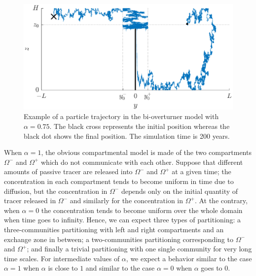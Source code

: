 \begin{figure}[!htp]
	\centering
	\includegraphics[width=\textwidth]{fig/problem2box/traj_with_transfer2.eps}
	\caption{Example of a particle trajectory in the bi-overturner model with $\alpha = 0.75$. The black cross represents the initial position whereas the black dot shows the final position. The simulation time is 200 years.}
	\label{fig:withtransfer}
\end{figure}
When $\alpha = 1$, the obvious compartmental model is made of the two compartments $\Omega^-$ and $\Omega^+$ which do not communicate with each other. Suppose that different amounts of passive tracer are released into $\Omega^-$ and $\Omega^+$ at a given time; the concentration in each compartment tends to become uniform in time due to diffusion, but the concentration in $\Omega^-$ depends only on the initial quantity of tracer released in $\Omega^-$ and similarly for the concentration in $\Omega^+$. At the contrary, when $\alpha = 0$ the concentration tends to become uniform over the whole domain when time goes to infinity. Hence, we can expect three types of partitioning: a three-communities partitioning with left and right compartments and an exchange zone in between; a two-communities partitioning corresponding to $\Omega^-$ and $\Omega^+$; and finally a trivial partitioning with one single community for very long time scales. For intermediate values of $\alpha$, we expect a behavior similar to the case $\alpha = 1$ when $\alpha$ is close to $1$ and similar to the case $\alpha = 0$ when $\alpha$ goes to $0$. 

